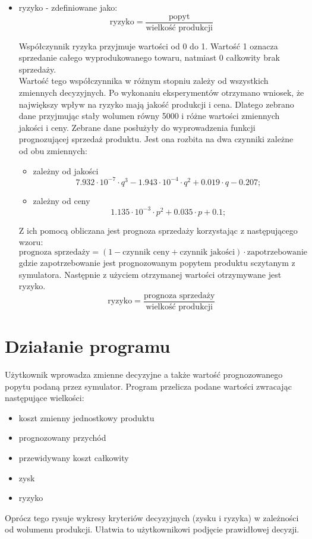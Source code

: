 \documentclass[10pt,a4paper]{article}
\begin{document}
\begin{itemize}
\item ryzyko - zdefiniowane jako:
\begin{equation*}
\text{ryzyko} = \frac{\text{popyt}}{\text{wielkość produkcji}}
\end{equation*}


Współczynnik ryzyka przyjmuje wartości od 0 do 1. Wartość 1 oznacza sprzedanie całego wyprodukowanego towaru, natmiast 0 całkowity brak sprzedaży. \\
Wartość tego współczynnika w różnym stopniu zależy od wszystkich zmiennych decyzyjnych. Po wykonaniu eksperymentów otrzymano wniosek, że największy wpływ na ryzyko mają jakość produkcji i cena. Dlatego zebrano dane przyjmując stały wolumen równy 5000 i różne wartości zmiennych jakości i ceny. Zebrane dane posłużyły do wyprowadzenia funkcji prognozującej sprzedaż produktu. Jest ona rozbita na dwa czynniki zależne od obu zmiennych:
\begin{itemize}
\item zależny od jakości
\begin{equation*}
7.932 \cdot 10^{-7} \cdot q^3 - 1.943 \cdot 10^{-4} \cdot q^2 + 0.019 \cdot q - 0.207;
\end{equation*}
\item zależny od ceny
\begin{equation*}
1.135 \cdot 10^{-3} \cdot p^2 + 0.035 \cdot p + 0.1;
\end{equation*}
\end{itemize}
Z ich pomocą obliczana jest prognoza sprzedaży korzystając z następującego wzoru:
\begin{equation*}
\text{prognoza sprzedaży} = (1-\text{czynnik ceny}+\text{czynnik jakości}) \cdot \text{zapotrzebowanie}
\end{equation*}
gdzie zapotrzebowanie jest prognozowanym popytem produktu sczytanym z symulatora.
Następnie z użyciem otrzymanej wartości otrzymywane jest ryzyko.
\begin{equation*}
\text{ryzyko} = \frac{\text{prognoza sprzedaży}}{\text{wielkość produkcji}}
\end{equation*}
\end{itemize}
\section{Działanie programu}
Użytkownik wprowadza zmienne decyzyjne a także wartość prognozowanego popytu podaną przez symulator. Program przelicza podane wartości zwracając następujące wielkości:
\begin{itemize}
\item koszt zmienny jednostkowy produktu
\item prognozowany przychód
\item przewidywany koszt całkowity
\item zysk
\item ryzyko
\end{itemize}
Oprócz tego rysuje wykresy kryteriów decyzyjnych (zysku i ryzyka) w zależności od wolumenu produkcji.
Ułatwia to użytkownikowi podjęcie prawidłowej decyzji.
\end{document}
